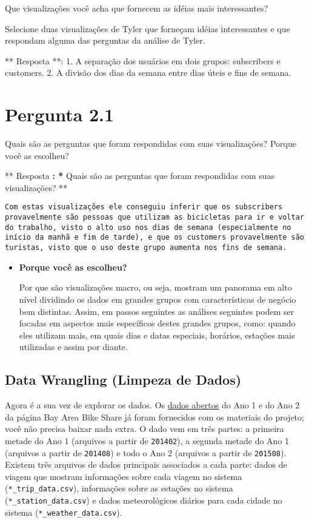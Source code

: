 \documentclass[11pt]{article}
\begin{document}
Que visualizações você acha que fornecem as idéias mais interessantes?

Selecione duas visualizações de Tyler que forneçam idéias interessantes
e que respondam alguma das perguntas da análise de Tyler.

    ** Resposta **: 1. A separação dos usuários em dois grupos: subscribers
e customers. 2. A divisão dos dias da semana entre dias úteis e fins de
semana.

    \section{Pergunta 2.1}\label{pergunta-2.1}

Quais são as perguntas que foram respondidas com suas visualizações?
Porque você as escolheu?

    ** Resposta \textbf{: * }Quais são as perguntas que foram respondidas
com suas visualizações? **

\begin{verbatim}
Com estas visualizações ele conseguiu inferir que os subscribers provavelmente são pessoas que utilizam as bicicletas para ir e voltar do trabalho, visto o alto uso nos dias de semana (especialmente no início da manhã e fim de tarde), e que os customers provavelmente são turistas, visto que o uso deste grupo aumenta nos fins de semana.
\end{verbatim}

\begin{itemize}
\item
  \textbf{Porque você as escolheu?}

  Por que são visualizações macro, ou seja, mostram um panorama em alto
  nível dividindo os dados em grandes grupos com características de
  negócio bem distintas. Assim, em passos seguintes as análises
  seguintes podem ser focadas em aspectos mais específicos destes
  grandes grupos, como: quando eles utilizam mais, em quais dias e datas
  especiais, horários, estações mais utilizadas e assim por diante.
\end{itemize}

    \subsection{Data Wrangling (Limpeza de
Dados)}\label{data-wrangling-limpeza-de-dados}

Agora é a sua vez de explorar os dados. Os
\href{http://www.bayareabikeshare.com/open-data}{dados abertos} do Ano 1
e do Ano 2 da página Bay Area Bike Share já foram fornecidos com os
materiais do projeto; você não precisa baixar nada extra. O dado vem em
três partes: a primeira metade do Ano 1 (arquivos a partir de
\texttt{201402}), a segunda metade do Ano 1 (arquivos a partir de
\texttt{201408}) e todo o Ano 2 (arquivos a partir de \texttt{201508}).
Existem três arquivos de dados principais associados a cada parte: dados
de viagem que mostram informações sobre cada viagem no sistema
(\texttt{*\_trip\_data.csv}), informações sobre as estações no sistema
(\texttt{*\_station\_data.csv}) e dados meteorológicos diários para cada
cidade no sistema (\texttt{*\_weather\_data.csv}).
\end{document}
